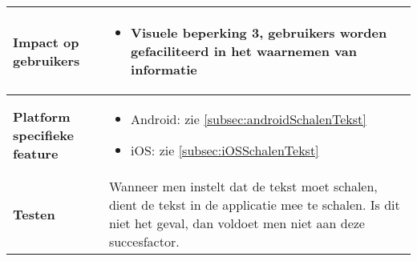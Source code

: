 \begin{table}[H]
\begin{tabular}{|l|p{12cm}|}
        \hline
        \textbf{Impact op gebruikers}         &  
        \begin{itemize}
            \item Visuele beperking 3, gebruikers worden gefaciliteerd in het waarnemen van informatie
        \end{itemize}                                                                                                                                                                                                                                                                                                                                                                                                                    \\ 
        \hline
        \textbf{Platform specifieke feature}  & \begin{itemize}
            \item Android: zie \ref{subsec:androidSchalenTekst}
            \item iOS: zie \ref{subsec:iOSSchalenTekst}
        \end{itemize}                                                                                                                                                                                                                                                                                                                                   \\ 
        \hline
        \textbf{Testen}                       & Wanneer men instelt dat de tekst moet schalen, dient de tekst in de applicatie mee te schalen. Is dit niet het geval, dan voldoet men niet aan deze succesfactor.                                                                                                                                                                                                                                                                            \\
        \hline
    \end{tabular}
\end{table}



